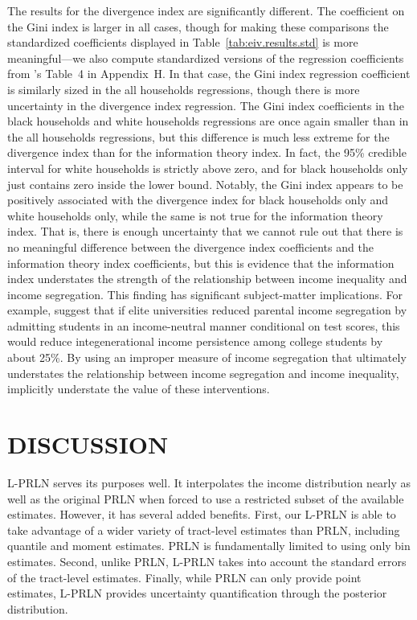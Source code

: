 \documentclass[12pt]{article}
\begin{document}
The results for the divergence index are significantly different. The coefficient on the Gini index is larger in all cases, though for making these comparisons the standardized coefficients displayed in Table~\ref{tab:eiv.results.std} is more meaningful---we also compute standardized versions of the regression coefficients from \citet{reardon2011income}'s Table~4 in Appendix~H. %
 In that case, the Gini index regression coefficient is similarly sized in the all households regressions, though there is more uncertainty in the divergence index regression. The Gini index coefficients in the black households and white households regressions are once again smaller than in the all households regressions, but this difference is much less extreme for the divergence index than for the information theory index. In fact, the 95\% credible interval for white households is strictly above zero, and for black households only just contains zero inside the lower bound. Notably, the Gini index appears to be positively associated with the divergence index for black households only and white households only, while the same is not true for the information theory index. That is, there is enough uncertainty that we cannot rule out that there is no meaningful difference between the divergence index coefficients and the information theory index coefficients, but this is evidence that the information index understates the strength of the relationship between income inequality and income segregation. This finding has significant subject-matter implications. For example, \citet{chetty2020income} suggest that if elite universities reduced parental income segregation by admitting students in an income-neutral manner conditional on test scores, this would reduce integenerational income persistence among college students by about 25\%. By using an improper measure of income segregation that ultimately understates the relationship between income segregation and income inequality, \citet{reardon2011income} implicitly understate the value of these interventions.

\section{DISCUSSION}\label{sec:discuss}
L-PRLN serves its purposes well. It interpolates the income distribution nearly as well as the original PRLN when forced to use a restricted subset of the available estimates. However, it has several added benefits. First, our L-PRLN is able to take advantage of a wider variety of tract-level estimates than PRLN, including quantile and moment estimates. PRLN is fundamentally limited to using only bin estimates. Second, unlike PRLN, L-PRLN takes into account the standard errors of the tract-level estimates. Finally, while PRLN can only provide point estimates, L-PRLN provides uncertainty quantification through the posterior distribution.
\end{document}
